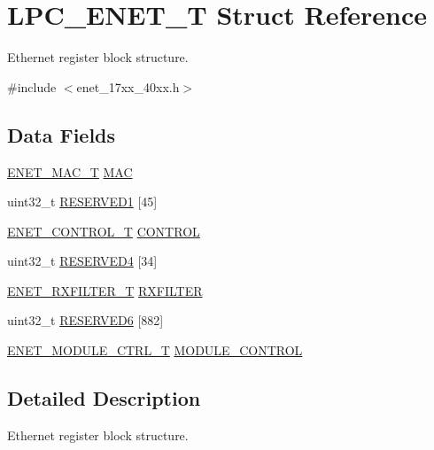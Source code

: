 \hypertarget{structLPC__ENET__T}{\section{L\-P\-C\-\_\-\-E\-N\-E\-T\-\_\-\-T Struct Reference}
\label{structLPC__ENET__T}
}


Ethernet register block structure.  




{\ttfamily \#include $<$enet\-\_\-17xx\-\_\-40xx.\-h$>$}

\subsection*{Data Fields}
\begin{DoxyCompactItemize}
\item 
\hyperlink{structENET__MAC__T}{E\-N\-E\-T\-\_\-\-M\-A\-C\-\_\-\-T} \hyperlink{structLPC__ENET__T_a2f1d337b7206673d31a165cee9c6b1aa}{M\-A\-C}
\item 
uint32\-\_\-t \hyperlink{structLPC__ENET__T_a5dd6bf9f10045f3599a60d157f38598b}{R\-E\-S\-E\-R\-V\-E\-D1} \mbox{[}45\mbox{]}
\item 
\hyperlink{structENET__CONTROL__T}{E\-N\-E\-T\-\_\-\-C\-O\-N\-T\-R\-O\-L\-\_\-\-T} \hyperlink{structLPC__ENET__T_a40bc06ba6a0ce4949f8a94550cfc9798}{C\-O\-N\-T\-R\-O\-L}
\item 
uint32\-\_\-t \hyperlink{structLPC__ENET__T_a21834684d9ccdf758a76d847fce309d1}{R\-E\-S\-E\-R\-V\-E\-D4} \mbox{[}34\mbox{]}
\item 
\hyperlink{structENET__RXFILTER__T}{E\-N\-E\-T\-\_\-\-R\-X\-F\-I\-L\-T\-E\-R\-\_\-\-T} \hyperlink{structLPC__ENET__T_a4076c6a080ba8b6e6e7af7343408080b}{R\-X\-F\-I\-L\-T\-E\-R}
\item 
uint32\-\_\-t \hyperlink{structLPC__ENET__T_a69971bdb50272af4d797c243b68a640a}{R\-E\-S\-E\-R\-V\-E\-D6} \mbox{[}882\mbox{]}
\item 
\hyperlink{structENET__MODULE__CTRL__T}{E\-N\-E\-T\-\_\-\-M\-O\-D\-U\-L\-E\-\_\-\-C\-T\-R\-L\-\_\-\-T} \hyperlink{structLPC__ENET__T_a279749cd4018c81be5aa07edfe62d3e7}{M\-O\-D\-U\-L\-E\-\_\-\-C\-O\-N\-T\-R\-O\-L}
\end{DoxyCompactItemize}


\subsection{Detailed Description}
Ethernet register block structure. 

